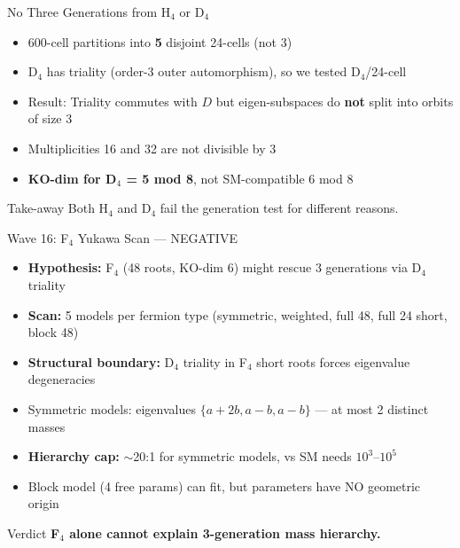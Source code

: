 \documentclass[aspectratio=169,11pt]{beamer}
\begin{document}
\begin{frame}{No Three Generations from H$_4$ or D$_4$}
  \begin{itemize}
    \item 600-cell partitions into \textbf{5} disjoint 24-cells (not 3)
    \item D$_4$ has triality (order-3 outer automorphism), so we tested D$_4$/24-cell
    \item Result: Triality commutes with $D$ but eigen-subspaces do \textbf{not} split into orbits of size 3
    \item Multiplicities 16 and 32 are not divisible by 3
    \item \textbf{KO-dim for D$_4$ = 5 mod 8}, not SM-compatible 6 mod 8
  \end{itemize}
  \vfill
  \begin{block}{Take-away}
    Both H$_4$ and D$_4$ fail the generation test for different reasons.
  \end{block}
\end{frame}

\begin{frame}{Wave 16: F$_4$ Yukawa Scan — NEGATIVE}
  \begin{itemize}
    \item \textbf{Hypothesis:} F$_4$ (48 roots, KO-dim 6) might rescue 3 generations via D$_4$ triality
    \item \textbf{Scan:} 5 models per fermion type (symmetric, weighted, full 48, full 24 short, block 48)
    \item \textbf{Structural boundary:} D$_4$ triality in F$_4$ short roots forces eigenvalue degeneracies
    \item Symmetric models: eigenvalues $\{a+2b, a-b, a-b\}$ — at most 2 distinct masses
    \item \textbf{Hierarchy cap:} $\sim$20:1 for symmetric models, vs SM needs $10^3$--$10^5$
    \item Block model (4 free params) can fit, but parameters have NO geometric origin
  \end{itemize}
  \vfill
  \begin{alertblock}{Verdict}
    \textbf{F$_4$ alone cannot explain 3-generation mass hierarchy.}
  \end{alertblock}
\end{frame}
\end{document}
